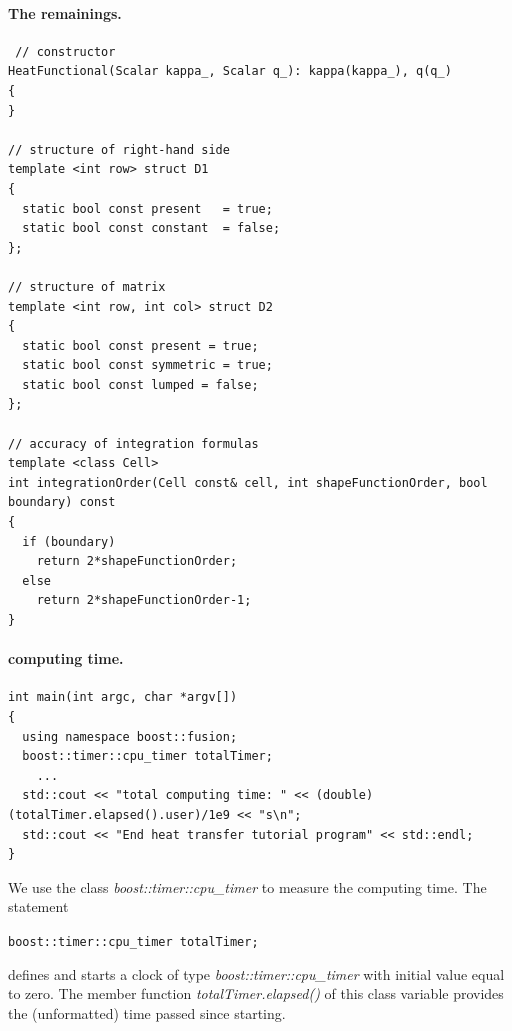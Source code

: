 \documentclass[11pt]{article}
\begin{document}
\paragraph{The remainings.} \qquad

\begin{lstlisting}
 // constructor
HeatFunctional(Scalar kappa_, Scalar q_): kappa(kappa_), q(q_)
{
}

// structure of right-hand side
template <int row> struct D1 
{
  static bool const present   = true;
  static bool const constant  = false;
};
  
// structure of matrix
template <int row, int col> struct D2 
{
  static bool const present = true;
  static bool const symmetric = true;
  static bool const lumped = false;
};

// accuracy of integration formulas
template <class Cell>
int integrationOrder(Cell const& cell, int shapeFunctionOrder, bool boundary) const 
{
  if (boundary) 
    return 2*shapeFunctionOrder;
  else
    return 2*shapeFunctionOrder-1;
}
\end{lstlisting}

\paragraph{computing time.} \qquad
\begin{lstlisting}
int main(int argc, char *argv[])
{
  using namespace boost::fusion;
  boost::timer::cpu_timer totalTimer;
    ...
  std::cout << "total computing time: " << (double)(totalTimer.elapsed().user)/1e9 << "s\n";
  std::cout << "End heat transfer tutorial program" << std::endl;
}
\end{lstlisting}

We use the class {\em boost::timer::cpu\_timer} to measure the computing time. The statement

{\tt boost::timer::cpu\_timer totalTimer;} 

defines and starts a clock of type {\em boost::timer::cpu\_timer} with
initial value equal to zero. The member function {\em totalTimer.elapsed()} of this class variable 
provides the (unformatted) time passed since starting.
\end{document}
